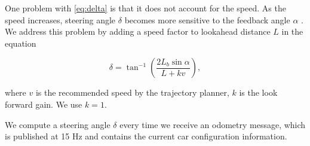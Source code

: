 One problem with \eqref{eq:delta} is that it does not account for the speed. As
the speed increases, steering angle $\delta$ becomes more sensitive to the
feedback angle $\alpha$ \cite{Kim2013SensorbasedMP}. We address this problem by
adding a speed factor to lookahead distance $L$ in the equation

\begin{equation}
  \delta = \tan^{-1}(\frac{2L_b\sin\alpha}{L + kv}),
  \label{eq:delta-with-speed-factor}
\end{equation}

where $v$ is the recommended speed by the trajectory planner, $k$ is the look
forward gain. We use $k = 1$.

We compute a steering angle $\delta$ every time we receive an odometry message,
which is published at 15 Hz and contains the current car configuration
information.
